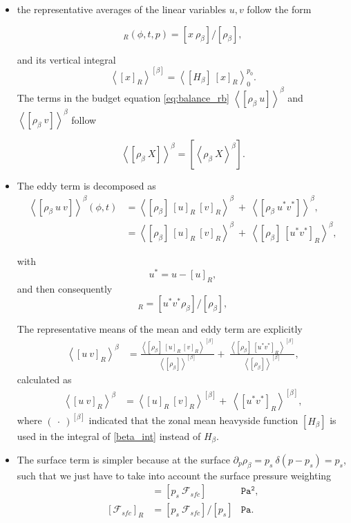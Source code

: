 \documentclass[11pt]{article}
\numberwithin{equation}{section}
\newcommand{\beq}{\begin{equation}}
\newcommand{\eeq}{\end{equation}}
\newcommand{\beqs}{\begin{equation*}}
\newcommand{\eeqs}{\end{equation*}}
\newcommand{\la}{\langle}
\newcommand{\ra}{\rangle}
\newcommand{\lara}[1]{\left\la{#1}\right\ra}
\newcommand{\rb}{\rho_\beta}
\begin{document}
\begin{itemize}

\item the representative averages of the linear variables $u, v$ follow the form %


\beq
[x]_R(\phi, t, p)=  [x~ \rb ]/ [ \rb], 
\eeq

and its vertical integral 
\beq
\lara{[x]_R}^{[\beta]} = \lara{ [H_\beta]~[x]_R}_0^{p_0}.
\eeq
The terms in the budget equation \eqref{eq:balance_rb}  $\lara{[\rb~ u]}^\beta$ and $\lara{ [\rb~ v]}^\beta$ follow

\beq
\lara{[\rb ~X]}^\beta =  [\lara{\rb ~X}^\beta].
\eeq


\item The eddy term is decomposed as
\begin{align}
\lara{[\rb~ u ~v]}^\beta(\phi, t) &=\lara{ [\rb]~[u]_R~[v]_R }^\beta~ +~\lara{[\rb~ u^* v^{*}]}^\beta, \nonumber \\
			&=\lara{ [\rb]~[u]_R~[v]_R }^\beta~ +~\lara{[\rb]~ [u^* v^*]_R}^\beta,
\end{align}

with 
\beqs
u^* = u - [u]_R,
\eeqs
and then consequently
\beqs
[u^* v^*]_R = [u^* v^*\rb ] /[\rb],
\eeqs


The representative means of the mean and eddy term are explicitly
\begin{align}
\lara{[u~ v]_R}^\beta &=\frac{ \lara{ [\rb]~[u]_R~[v]_R }^{[\beta]}  }{ \lara{[\rb]}^{[\beta]}  }  +~\frac{\lara{[\rb]~ [u^* v^*]_R}^{[\beta]}}{ \lara{[\rb]}^{[\beta]} } ,
\end{align}
calculated as 
\begin{align}
\lara{[u~ v]_R}^\beta &=\lara{ [u]_R~[v]_R  }^{[\beta]}  +~ \lara{  [u^* v^*]_R }^{[\beta]} ,
\end{align}
where $(~\cdot~)^{[\beta]}$ indicated that the zonal mean heavyside function $[H_\beta]$ is used in the integral of \eqref{beta_int} instead of $H_\beta$.

\item The surface term is simpler because at the surface $\partial_p \rb = p_s ~\delta(p- p_s) = p_s$, such that we just have to take into account the surface pressure weighting
\begin{align*}
[\rb ~\mathcal{F}_{sfc}] &= [p_s~  \mathcal{F}_{sfc}]   &\mathtt{Pa^2},\\
[\mathcal{F}_{sfc}]_R &= [p_s~  \mathcal{F}_{sfc}] / [p_s]   &\mathtt{Pa}.
\end{align*}


\end{itemize}
\end{document}
